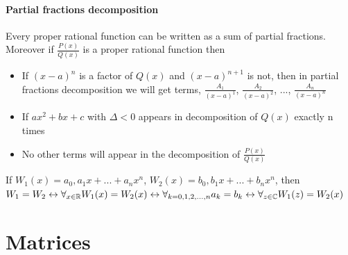 \documentclass{report}
\begin{document}
\subsubsection{Partial fractions decomposition}
Every proper rational function can be written as a sum of partial fractions. Moreover if $\frac{P(x)}{Q(x)}$ is a proper rational function then
\begin{itemize}
	\item If $(x-a)^n$ is a factor of $Q(x)$ and $(x-a)^{n+1}$ is not, then in partial fractions decomposition we will get terms, $\frac{A_1}{(x-a)^1}$, $\frac{A_2}{(x-a)^2}$, ..., $\frac{A_n}{(x-a)^n}$
	\item If $ax^2 + bx + c$ with $\Delta < 0$ appears in decomposition of $Q(x)$ exactly n times
	\item No other terms will appear in the decomposition of $\frac{P(x)}{Q(x)}$
\end{itemize}
\LARGE
If $W_1(x) = a_0, a_1x + ... + a_nx^n$, $W_2(x) = b_0, b_1x + ... + b_nx^n$, then $W_1 = W_2 \leftrightarrow \\ \forall_{x\in\mathbb{R}} W_1(x) = W_2(x) \leftrightarrow \\ \forall_{k=0, 1, 2, ... , n} a_k = b_k \leftrightarrow \\ \forall_{z\in\mathbb{C}} W_1(z) = W_2(x)$
\large



\chapter{Matrices}
\end{document}
